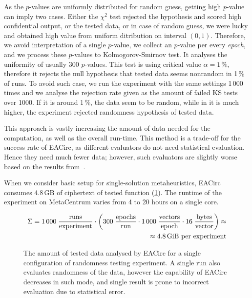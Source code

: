 \documentclass[
  print, %
  Table,   %
  nolof,     %
  nolot,     %
  11pt, %
  oneside  %
]{fithesis3}
\begin{document}
As the $p$-values are uniformly distributed for random guess, getting high $p$-value can imply two cases. Either the $\chi^{2}$ test rejected the hypothesis and scored high confidential output, or the tested data, or in case of random guess, we were lucky and obtained high value from uniform ditribution on interval $(0, 1)$. Therefore, we avoid interpretation of a single $p$-value, we collect an $p$-value per every \textit{epoch}, and we process these $p$-values to Kolmogorov-Smirnov test. It analyses the uniformity of usually 300 $p$-values. This test is using critical value $\alpha = 1\,\%$, therefore it rejects the null hypothesis that tested data seems nonrandom in 1\,\% of runs. To avoid such case, we run the experiment with the same settings 1\,000 times and we analyse the rejection rate given as the amount of failed KS tests over 1000. If it is around 1\,\%, the data seem to be random, while in it is much higher, the experiment rejected randomness hypothesis of tested data.

This approach is vastly increasing the amount of data needed for the computation, as well as the overall run-time. This method is a trade-off for the success rate of EACirc, as different evaluators do not need statistical evaluation. Hence they need much fewer data; however, such evaluators are slightly worse based on the results from~\cite{svenda2013towards}.

When we consider basic setup for single-solution metaheuristics, EACirc consumes 4.8\,GB of ciphertext of tested function (\cref{fig:dataUsage}). The runtime of the experiment on MetaCentrum varies from 4 to 20 hours on a single core.

\begin{figure}[t]
    \begin{equation*}
        \begin{aligned}
    \Sigma = 1\,000 \;
             \frac{\textnormal{runs}}
                  {\textnormal{experiment}}
             \cdot
             \left(
             300 \;
             \frac{\textnormal{epochs}}
                  {\textnormal{run}}
             \cdot
             1\,000 \;
             \frac{\textnormal{vectors}}
                  {\textnormal{epoch}}
             \cdot
             16 \;
             \frac{\textnormal{bytes}}
                  {\textnormal{vector}}
             \right) \approx\\
             \approx 4.8 \textnormal{\,GiB per experiment}
        \end{aligned}
    \end{equation*}
    \caption{The amount of tested data analysed by EACirc for a single configuration of randomness testing experiment. A single run also evaluates randomness of the data, however the capability of EACirc decreases in such mode, and single result is prone to incorrect evaluation due to statistical error.}
    \label{fig:dataUsage}
\end{figure}
\end{document}
